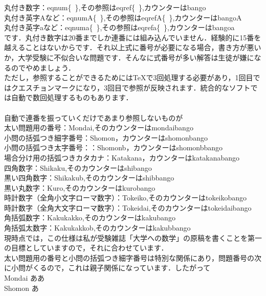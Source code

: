 \documentclass [10pt,fleqn,b5paper]{jsarticlek}
\begin{document}
丸付き数字：\yy eqnum\{\ \},その参照は\yy eqref\{\ \},カウンターはbango\\
丸付き英字Aなど：\yy eqnumA\{\ \},その参照は\yy eqrefA\{\ \},カウンターはbangoA\\
丸付き英字aなど：\yy eqnuma\{\ \},その参照は\yy eqrefa\{\ \},カウンターはbangoa\\
です．丸付き数字は20番までしか連番には組み込んでいません．経験的に15番を越えることはないからです．それ以上式に番号が必要になる場合，書き方が悪いか，大学受験に不似合いな問題です．そんなに式番号が多い解答は生徒が嫌になるのでやめましょう．\\
ただし，参照することができるためにはTeXで3回処理する必要があり，1回目ではクエスチョンマークになり，3回目で参照が反映されます．統合的なソフトでは自動で数回処理するものもあります．
\\
\\
自動で連番を振っていくだけであまり参照しないものが\\
太い問題用の番号：\yy Mondai,そのカウンターはmondaibango\\
小問の括弧つき細字番号：\yy Shomon，カウンターはshomonbango\\
小問の括弧つき太字番号：：\yy Shomonb，カウンターはshomonbbango\\
場合分け用の括弧つきカタカナ：\yy Katakana，カウンターはkatakanabango\\
四角数字：\yy Shikaku,そのカウンターはshibango\\
黒い四角数字：\yy Shikakub,そのカウンターはshibbango\\
黒い丸数字：\yy Kuro,そのカウンターはkurobango\\
時計数字（全角小文字ローマ数字）：\yy Tokeiko,そのカウンターはtokeikobango\\
時計数字（全角大文字ローマ数字）：\yy Tokeidai,そのカウンターはtokeidaibango\\
角括弧数字：\yy Kakukakko,そのカウンターはkakubango\\
角括弧太数字：\yy Kakukakkob,そのカウンターはkakubbango\\
現時点では，この仕様は私が受験雑誌「大学への数学」の原稿を書くことを第一の目標としていますので，それに合わせています．\\
太い問題用の番号と小問の括弧つき細字番号は特別な関係にあり，問題番号の次に小問がくるので，これは親子関係になっています．したがって\\
\yy Mondai ああ\yy\yy\\
\yy Shomon あ\yy\yy\\
\end{document}

